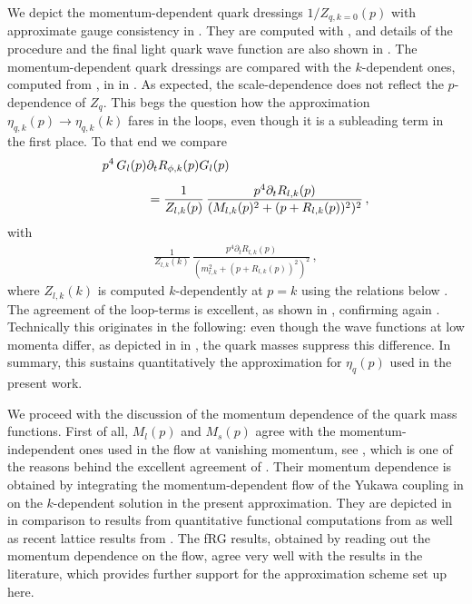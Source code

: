 \documentclass[aps,twocolumn,prd,superscriptaddress]{revtex4-2}
\begin{document}
We depict the momentum-dependent quark dressings $1/Z_{q, k=0}(p)$ with approximate gauge consistency in . They are computed with , and details of the procedure and the final light quark wave function are also shown in . The momentum-dependent quark dressings are compared with the $k$-dependent ones, computed from , in  in . As expected, the scale-dependence does not reflect the $p$-dependence of $Z_q$. This begs the question how the approximation $\eta_{q,k}(p) \to \eta_{q,k}(k)$ fares in the loops, even though it is a subleading term in the first place. To that end we compare 
%
\begin{align}\label{eq:FlowGq_p}
	p^4\,G_l(p)&\partial_t R_{\phi,k}(p)G_l(p) 
	\notag\\[1ex]
	&=\frac{1}{Z_{l,k}(p)} \, \frac{p^4\partial_t R_{l,k}(p)}{(M_{l,k}(p)^2 + (p + R_{l,k}(p))^2)^2}\,,
\end{align}
%
with
%
\begin{align}\label{eq:FlowGq_k}
	\frac{1}{Z_{l,k}(k)} \, \frac{p^4\partial_t R_{l,k}(p)}{(m_{l,k}^2 + (p + R_{l,k}(p))^2)^2}\,,
\end{align}
%
where $Z_{l,k}(k)$ is computed $k$-dependently at $p=k$ using the relations below .
The agreement of the loop-terms is excellent, as shown in , confirming again . Technically this originates in the following: even though the wave functions at low momenta differ, as depicted in  in , the quark masses suppress this difference. In summary, this sustains quantitatively the approximation for $\eta_q(p)$ used in the present work. 

We proceed with the discussion of the momentum dependence of the quark mass functions. First of all, $M_l(p)$ and $M_s(p)$ agree with the momentum-independent ones used in the flow at vanishing momentum, see , which is one of the reasons behind the excellent agreement of . Their momentum dependence is obtained by integrating the momentum-dependent flow of the Yukawa coupling  in  on the $k$-dependent solution in the present approximation. They are depicted in  in comparison to results from quantitative functional computations from \cite{Gao:2021wun} as well as recent lattice results from \cite{Chang:2021vvx}. The fRG results, obtained by reading out the momentum dependence on the flow, agree very well with the results in the literature, which provides further support for the approximation scheme set up here. 
\end{document}
